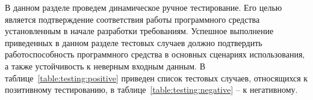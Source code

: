 В данном разделе проведем динамическое ручное тестирование. Его целью является подтверждение соответствия работы
программного средства установленным в начале разработки требованиям. Успешное выполнение приведенных в
данном разделе тестовых случаев должно подтвердить работоспособность программного средства в основных сценариях
использования, а также устойчивость к неверным входным данным. В таблице~\ref{table:testing:positive} приведен список
тестовых случаев, относящихся к позитивному тестированию, в таблице~\ref{table:testing:negative} -- к негативному.

\newcommand\testnumber{\stepcounter{testnumber}\arabic{testnumber}}

\renewcommand{\labelenumi}{\arabic{enumi})}
\renewcommand{\labelenumii}{\asbuk{enumii})}

